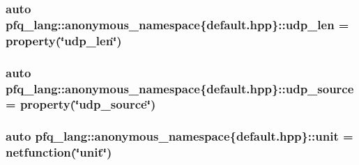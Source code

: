 \hypertarget{namespacepfq__lang_1_1anonymous__namespace_02default_8hpp_03_ab0dcf23db0f218100e7fe51562e0add1}{
\subsubsection[{udp\+\_\+len}]{\setlength{\rightskip}{0pt plus 5cm}auto pfq\+\_\+lang\+::anonymous\+\_\+namespace\{default.\+hpp\}\+::udp\+\_\+len = {\bf property}(\char`\"{}udp\+\_\+len\char`\"{})}}\label{namespacepfq__lang_1_1anonymous__namespace_02default_8hpp_03_ab0dcf23db0f218100e7fe51562e0add1}
\hypertarget{namespacepfq__lang_1_1anonymous__namespace_02default_8hpp_03_a7d2943522cfb795fcb82c894dba83292}{
\subsubsection[{udp\+\_\+source}]{\setlength{\rightskip}{0pt plus 5cm}auto pfq\+\_\+lang\+::anonymous\+\_\+namespace\{default.\+hpp\}\+::udp\+\_\+source = {\bf property}(\char`\"{}udp\+\_\+source\char`\"{})}}\label{namespacepfq__lang_1_1anonymous__namespace_02default_8hpp_03_a7d2943522cfb795fcb82c894dba83292}
\hypertarget{namespacepfq__lang_1_1anonymous__namespace_02default_8hpp_03_ae78caafebdc64f9180032a049b7c3b3a}{
\subsubsection[{unit}]{\setlength{\rightskip}{0pt plus 5cm}auto pfq\+\_\+lang\+::anonymous\+\_\+namespace\{default.\+hpp\}\+::unit = {\bf netfunction}(\char`\"{}unit\char`\"{})}}\label{namespacepfq__lang_1_1anonymous__namespace_02default_8hpp_03_ae78caafebdc64f9180032a049b7c3b3a}
